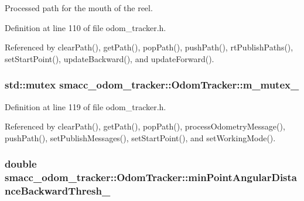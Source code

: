 Processed path for the mouth of the reel. 



Definition at line 110 of file odom\+\_\+tracker.\+h.



Referenced by clear\+Path(), get\+Path(), pop\+Path(), push\+Path(), rt\+Publish\+Paths(), set\+Start\+Point(), update\+Backward(), and update\+Forward().

\subsubsection[{\texorpdfstring{m\+\_\+mutex\+\_\+}{m_mutex_}}]{\setlength{\rightskip}{0pt plus 5cm}std\+::mutex smacc\+\_\+odom\+\_\+tracker\+::\+Odom\+Tracker\+::m\+\_\+mutex\+\_\+\hspace{0.3cm}{\ttfamily [protected]}}\hypertarget{classsmacc__odom__tracker_1_1OdomTracker_ad65e52bfd236e073940808c35f2bed8c}{}\label{classsmacc__odom__tracker_1_1OdomTracker_ad65e52bfd236e073940808c35f2bed8c}


Definition at line 119 of file odom\+\_\+tracker.\+h.



Referenced by clear\+Path(), get\+Path(), pop\+Path(), process\+Odometry\+Message(), push\+Path(), set\+Publish\+Messages(), set\+Start\+Point(), and set\+Working\+Mode().

\subsubsection[{\texorpdfstring{min\+Point\+Angular\+Distance\+Backward\+Thresh\+\_\+}{minPointAngularDistanceBackwardThresh_}}]{\setlength{\rightskip}{0pt plus 5cm}double smacc\+\_\+odom\+\_\+tracker\+::\+Odom\+Tracker\+::min\+Point\+Angular\+Distance\+Backward\+Thresh\+\_\+\hspace{0.3cm}{\ttfamily [protected]}}\hypertarget{classsmacc__odom__tracker_1_1OdomTracker_ac7cac171a63c8981f8233f71c94d0776}{}\label{classsmacc__odom__tracker_1_1OdomTracker_ac7cac171a63c8981f8233f71c94d0776}


